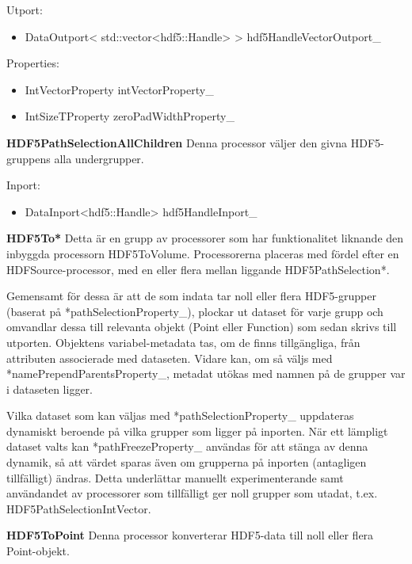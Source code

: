\documentclass[10pt,oneside,swedish]{article}
\providecommand{\tightlist}{%
  \setlength{\itemsep}{0pt}\setlength{\parskip}{0pt}}
\begin{document}
Utport:

\begin{itemize}
\tightlist
\item
  DataOutport\textless{}
  std::vector\textless{}hdf5::Handle\textgreater{} \textgreater{}
  hdf5HandleVectorOutport\_
\end{itemize}

Properties:

\begin{itemize}
\tightlist
\item
  IntVectorProperty intVectorProperty\_
\item
  IntSizeTProperty zeroPadWidthProperty\_
\end{itemize}

\textbf{HDF5PathSelectionAllChildren} Denna processor väljer den givna
HDF5-gruppens alla undergrupper.

Inport:

\begin{itemize}
\tightlist
\item
  DataInport\textless{}hdf5::Handle\textgreater{} hdf5HandleInport\_
\end{itemize}

\textbf{HDF5To*} Detta är en grupp av processorer som har funktionalitet
liknande den inbyggda processorn HDF5ToVolume. Processorerna placeras
med fördel efter en HDFSource-processor, med en eller flera mellan
liggande HDF5PathSelection*.

Gemensamt för dessa är att de som indata tar noll eller flera
HDF5-grupper (baserat på *pathSelectionProperty\_), plockar ut dataset
för varje grupp och omvandlar dessa till relevanta objekt (Point eller
Function) som sedan skrivs till utporten. Objektens variabel-metadata
tas, om de finns tillgängliga, från attributen associerade med
dataseten. Vidare kan, om så väljs med *namePrependParentsProperty\_,
metadat utökas med namnen på de grupper var i dataseten ligger.

Vilka dataset som kan väljas med *pathSelectionProperty\_ uppdateras
dynamiskt beroende på vilka grupper som ligger på inporten. När ett
lämpligt dataset valts kan *pathFreezeProperty\_ användas för att stänga
av denna dynamik, så att värdet sparas även om grupperna på inporten
(antagligen tillfälligt) ändras. Detta underlättar manuellt
experimenterande samt användandet av processorer som tillfälligt ger
noll grupper som utadat, t.ex. HDF5PathSelectionIntVector.

\textbf{HDF5ToPoint} Denna processor konverterar HDF5-data till noll
eller flera Point-objekt.
\end{document}

